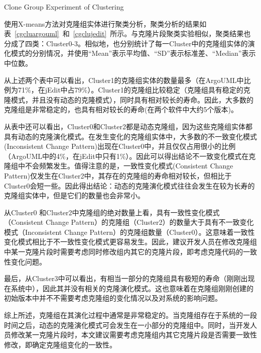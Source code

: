 {Clone Group Experiment of Clustering} 

使用X-means方法对克隆组实体进行聚类分析，聚类分析的结果如表~\ref{cgcluargouml}~和~\ref{cgclujedit}~所示。与克隆片段聚类实验相似，聚类结果也分成了四类：Cluster0-3。相似地，也分别统计了每一Cluster中的克隆组实体的演化模式的分别情况，并使用“Mean”表示平均值、“SD”表示标准差、“Median”表示中位数。

从上述两个表中可以看出，Cluster1的克隆组实体的数量最多（在ArgoUML中比例为71\%，在jEdit中占79\%）。Cluster1的克隆组比较稳定（克隆组具有稳定的克隆模式，并且没有动态的克隆模式），同时具有相对较长的寿命。因此，大多数的克隆组是非常稳定的，也具有相对较长的寿命(在两个软件中大约5个版本)。

从表中还可以看出，Cluster0和Cluster2都是动态克隆组，因为这些克隆组实体都具有动态的克隆演化模式。在发生变化的克隆组实体中，大多数的不一致变化模式(Inconsistent Change Pattern)出现在Cluster0中，并且仅仅占用很小的比例（ArgoUML中的4\%，在jEdit中只有1\%）。因此可以得出结论不一致变化模式在克隆组中不会频繁发生。值得注意的是，一致性变化模式(Consistent Change Pattern)仅发生在Cluster2中，其存在的克隆组的寿命相对较长，但相比于Cluster0会短一些。因此得出结论：动态的克隆演化模式往往会发生在较为长寿的克隆组实体中，但是它们的数量也会非常小。

从Cluster0 和Cluster2中克隆组的绝对数量上看，具有一致性变化模式（Consistent Change Pattern）的克隆组（Cluster2）的数量大于具有不一致变化模式（Inconsistent Change Pattern）的克隆组数量（Cluster0）。这意味着一致性变化模式相比于不一致性变化模式更容易发生。因此，建议开发人员在修改克隆组中某一克隆片段时需要考虑同时修改组内其它的克隆片段，即考虑克隆代码的一致性变化问题。

最后，从Cluster3中可以看出，有相当一部分的克隆组具有极短的寿命（刚刚出现在系统中），因此其并没有相关的克隆演化模式。这也意味着在克隆组刚刚创建的初始版本中并不不需要考虑克隆组的变化情况以及对系统的影响问题。

综上所述，克隆组在其演化过程中通常是非常稳定的。当克隆组存在于系统的一段时间之后，动态的克隆演化模式可会发生在一小部分的克隆组中。同时，当开发人员修改某一克隆片段时，本文建议需要考虑克隆组内其它克隆片段是否需要一致性修改，即确定克隆组变化的一致性。

